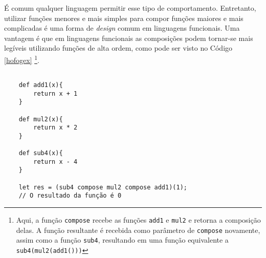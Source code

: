 É comum qualquer linguagem permitir esse tipo 
de comportamento. Entretanto, 
utilizar funções menores e mais simples para compor 
funções maiores e mais complicadas é uma forma de 
\textit{design} comum em linguagens funcionais. Uma vantagem é 
que em linguagens funcionais as composições podem 
tornar-se mais legíveis utilizando funções 
de alta ordem, como pode ser visto no Código 
\ref{hofogex} \footnote{Aqui, a função \texttt{compose} 
recebe as funções \texttt{add1} e \texttt{mul2} e retorna a 
composição delas. A função resultante 
é recebida como parâmetro de \texttt{compose} novamente, 
assim como a função \texttt{sub4}, resultando em uma função 
equivalente a \texttt{sub4(mul2(add1()))}}.

\begin{lstlisting}[caption={Exemplo de Composição de Funções. Fonte: O Autor (2021)},label=hofogex]

    def add1(x){
        return x + 1
    }

    def mul2(x){
        return x * 2
    }

    def sub4(x){
        return x - 4
    }

    let res = (sub4 compose mul2 compose add1)(1);
    // O resultado da função é 0

\end{lstlisting}
